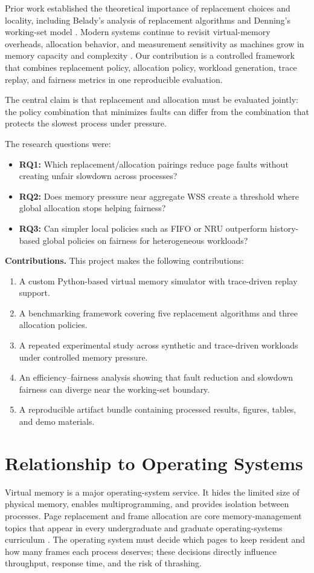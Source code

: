 \documentclass[conference]{IEEEtran}
\begin{document}
Prior work established the theoretical importance of replacement choices and locality, including Belady's analysis of replacement algorithms and Denning's working-set model \cite{Belady1966,Denning1968,Denning1970}. Modern systems continue to revisit virtual-memory overheads, allocation behavior, and measurement sensitivity as machines grow in memory capacity and complexity \cite{Basu2013,Park2022,Powers2019,Mytkowicz2009}. Our contribution is a controlled framework that combines replacement policy, allocation policy, workload generation, trace replay, and fairness metrics in one reproducible evaluation.

The central claim is that replacement and allocation must be evaluated jointly: the policy combination that minimizes faults can differ from the combination that protects the slowest process under pressure.

The research questions were:
\begin{itemize}
  \item \textbf{RQ1:} Which replacement/allocation pairings reduce page faults without creating unfair slowdown across processes?
  \item \textbf{RQ2:} Does memory pressure near aggregate WSS create a threshold where global allocation stops helping fairness?
  \item \textbf{RQ3:} Can simpler local policies such as FIFO or NRU outperform history-based global policies on fairness for heterogeneous workloads?
\end{itemize}

\textbf{Contributions.} This project makes the following contributions:
\begin{enumerate}
  \item A custom Python-based virtual memory simulator with trace-driven replay support.
  \item A benchmarking framework covering five replacement algorithms and three allocation policies.
  \item A repeated experimental study across synthetic and trace-driven workloads under controlled memory pressure.
  \item An efficiency--fairness analysis showing that fault reduction and slowdown fairness can diverge near the working-set boundary.
  \item A reproducible artifact bundle containing processed results, figures, tables, and demo materials.
\end{enumerate}

\section{Relationship to Operating Systems}
Virtual memory is a major operating-system service. It hides the limited size of physical memory, enables multiprogramming, and provides isolation between processes. Page replacement and frame allocation are core memory-management topics that appear in every undergraduate and graduate operating-systems curriculum \cite{Silberschatz2019}. The operating system must decide which pages to keep resident and how many frames each process deserves; these decisions directly influence throughput, response time, and the risk of thrashing.
\end{document}
